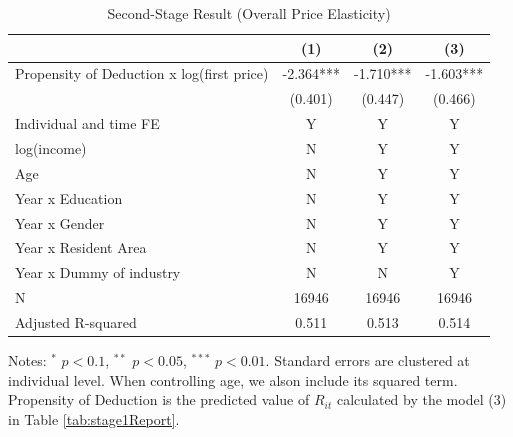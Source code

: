 \documentclass[
  11pt,
  a4paper,
]{article}
\begin{document}
\begin{table}

\caption{\label{tab:OverallReport}Second-Stage Result (Overall Price Elasticity)}
\centering
\fontsize{9}{11}\selectfont
\begin{threeparttable}
\begin{tabular}[t]{lccc}
\toprule
 & (1) & (2) & (3)\\
\midrule
Propensity of Deduction x log(first price) & -2.364*** & -1.710*** & -1.603***\\
 & (0.401) & (0.447) & (0.466)\\
Individual and time FE & Y & Y & Y\\
log(income) & N & Y & Y\\
Age & N & Y & Y\\
Year x Education & N & Y & Y\\
Year x Gender & N & Y & Y\\
Year x Resident Area & N & Y & Y\\
Year x Dummy of industry & N & N & Y\\
N & 16946 & 16946 & 16946\\
Adjusted R-squared & 0.511 & 0.513 & 0.514\\
\bottomrule
\end{tabular}
\begin{tablenotes}
\item Notes: $^{*}$ $p < 0.1$, $^{**}$ $p < 0.05$, $^{***}$ $p < 0.01$. Standard errors are clustered at individual level. When controlling age, we alson include its squared term. Propensity of Deduction is the predicted value of $R_{it}$ calculated by the model (3) in Table \ref{tab:stage1Report}.
\end{tablenotes}
\end{threeparttable}
\end{table}
\end{document}
